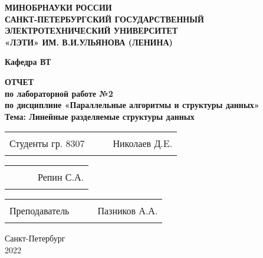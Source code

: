 \begin{titlepage}
\begin{center}
    \uppercase{\textbf{Минобрнауки России\\
            Санкт-Петербургский государственный\\
            электротехнический университет\\
            «ЛЭТИ» им. В.И.Ульянова (Ленина)
    }}
    \vspace{0.25cm}

    \textbf{Кафедра ВТ}
    \vfill

    \uppercase{\textbf{\large{
        Отчет
    }}}
    \\
    \textbf{\large{
      по лабораторной работе №2\\
      по дисциплине «Параллельные алгоритмы и структуры данных»\\
      Тема: Линейные разделяемые структуры данных
      \vspace{0.5cm}
    }}
  \bigskip
\end{center}
\vfill
\vfill

\noindent

\begin{tabularx}{\textwidth}{@{}lcXr}
    Студенты гр. 8307 & \hspace{1.6cm} & \rule{5cm}{1pt} & Николаев Д.E.
\end{tabularx}

\begin{tabularx}{\textwidth}{@{}lcXr}
    \phantom{Студенты гр. 8307} & \hspace{1.6cm} & \rule{5cm}{1pt} & Репин С.А.
\end{tabularx}

\vspace{0.5cm}

\noindent
\begin{tabularx}{\textwidth}{@{}lcXr}
    Преподаватель & \hspace{2.3cm} & \rule{5cm}{1pt} & Пазников А.А.
\end{tabularx}

\hfill \break
\hfill \break

\begin{center}
  Санкт-Петербург\\2022
\end{center}

\end{titlepage}

